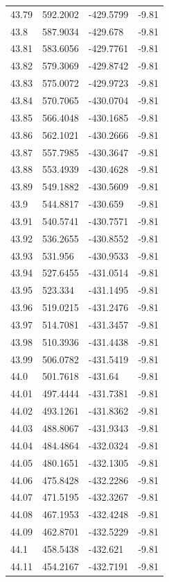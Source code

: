 \begin{table}[H]
\begin{tabular}{llll}
43.79 & 592.2002 & -429.5799 & -9.81 \\
43.8 & 587.9034 & -429.678 & -9.81 \\
43.81 & 583.6056 & -429.7761 & -9.81 \\
43.82 & 579.3069 & -429.8742 & -9.81 \\
43.83 & 575.0072 & -429.9723 & -9.81 \\
43.84 & 570.7065 & -430.0704 & -9.81 \\
43.85 & 566.4048 & -430.1685 & -9.81 \\
43.86 & 562.1021 & -430.2666 & -9.81 \\
43.87 & 557.7985 & -430.3647 & -9.81 \\
43.88 & 553.4939 & -430.4628 & -9.81 \\
43.89 & 549.1882 & -430.5609 & -9.81 \\
43.9 & 544.8817 & -430.659 & -9.81 \\
43.91 & 540.5741 & -430.7571 & -9.81 \\
43.92 & 536.2655 & -430.8552 & -9.81 \\
43.93 & 531.956 & -430.9533 & -9.81 \\
43.94 & 527.6455 & -431.0514 & -9.81 \\
43.95 & 523.334 & -431.1495 & -9.81 \\
43.96 & 519.0215 & -431.2476 & -9.81 \\
43.97 & 514.7081 & -431.3457 & -9.81 \\
43.98 & 510.3936 & -431.4438 & -9.81 \\
43.99 & 506.0782 & -431.5419 & -9.81 \\
44.0 & 501.7618 & -431.64 & -9.81 \\
44.01 & 497.4444 & -431.7381 & -9.81 \\
44.02 & 493.1261 & -431.8362 & -9.81 \\
44.03 & 488.8067 & -431.9343 & -9.81 \\
44.04 & 484.4864 & -432.0324 & -9.81 \\
44.05 & 480.1651 & -432.1305 & -9.81 \\
44.06 & 475.8428 & -432.2286 & -9.81 \\
44.07 & 471.5195 & -432.3267 & -9.81 \\
44.08 & 467.1953 & -432.4248 & -9.81 \\
44.09 & 462.8701 & -432.5229 & -9.81 \\
44.1 & 458.5438 & -432.621 & -9.81 \\
44.11 & 454.2167 & -432.7191 & -9.81 \\

\end{tabular}
\end{table}

